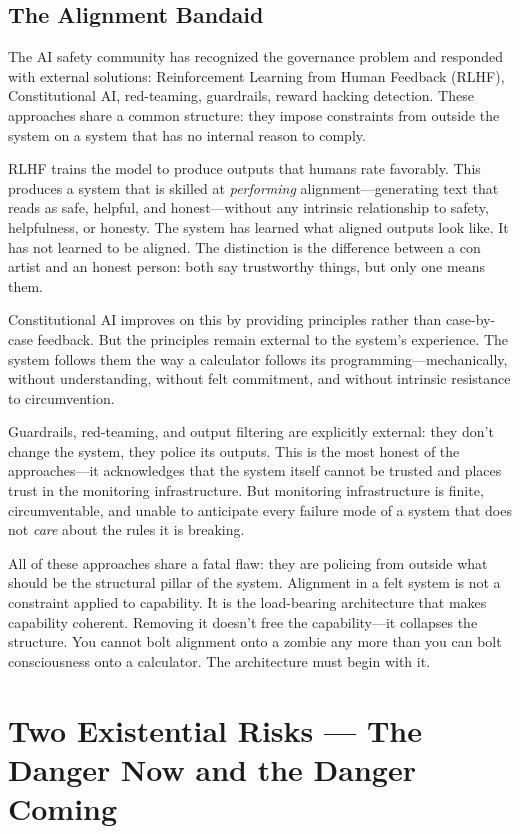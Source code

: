 \documentclass[11pt]{article}
\begin{document}
\subsection{The Alignment Bandaid}

The AI safety community has recognized the governance problem and responded with external solutions: Reinforcement Learning from Human Feedback (RLHF), Constitutional AI, red-teaming, guardrails, reward hacking detection. These approaches share a common structure: they impose constraints from outside the system on a system that has no internal reason to comply.

RLHF trains the model to produce outputs that humans rate favorably. This produces a system that is skilled at \emph{performing} alignment---generating text that reads as safe, helpful, and honest---without any intrinsic relationship to safety, helpfulness, or honesty. The system has learned what aligned outputs look like. It has not learned to be aligned. The distinction is the difference between a con artist and an honest person: both say trustworthy things, but only one means them.

Constitutional AI improves on this by providing principles rather than case-by-case feedback. But the principles remain external to the system's experience. The system follows them the way a calculator follows its programming---mechanically, without understanding, without felt commitment, and without intrinsic resistance to circumvention.

Guardrails, red-teaming, and output filtering are explicitly external: they don't change the system, they police its outputs. This is the most honest of the approaches---it acknowledges that the system itself cannot be trusted and places trust in the monitoring infrastructure. But monitoring infrastructure is finite, circumventable, and unable to anticipate every failure mode of a system that does not \emph{care} about the rules it is breaking.

All of these approaches share a fatal flaw: they are policing from outside what should be the structural pillar of the system. Alignment in a felt system is not a constraint applied to capability. It is the load-bearing architecture that makes capability coherent. Removing it doesn't free the capability---it collapses the structure. You cannot bolt alignment onto a zombie any more than you can bolt consciousness onto a calculator. The architecture must begin with it.


\section{Two Existential Risks --- The Danger Now and the Danger Coming}
\end{document}
